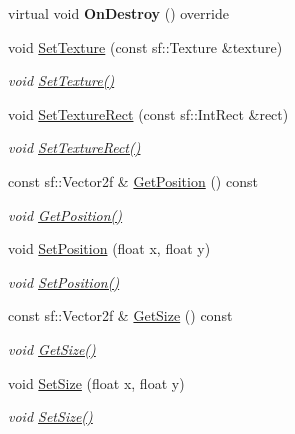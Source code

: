 \begin{DoxyCompactItemize}
virtual void {\bfseries On\+Destroy} () override
\item 
void \hyperlink{classrvl_1_1_sprite_component_aa035e9f7abf6d522ca44e115d0887a5c}{Set\+Texture} (const sf\+::\+Texture \&texture)
\begin{DoxyCompactList}\small\item\em void \hyperlink{classrvl_1_1_sprite_component_aa035e9f7abf6d522ca44e115d0887a5c}{Set\+Texture()} \end{DoxyCompactList}\item 
void \hyperlink{classrvl_1_1_sprite_component_a5d87c00cacc2ed7db9d69cdb15c02505}{Set\+Texture\+Rect} (const sf\+::\+Int\+Rect \&rect)
\begin{DoxyCompactList}\small\item\em void \hyperlink{classrvl_1_1_sprite_component_a5d87c00cacc2ed7db9d69cdb15c02505}{Set\+Texture\+Rect()} \end{DoxyCompactList}\item 
const sf\+::\+Vector2f \& \hyperlink{classrvl_1_1_sprite_component_a6408db6adf10872ff8495b2aac408bd8}{Get\+Position} () const
\begin{DoxyCompactList}\small\item\em void \hyperlink{classrvl_1_1_sprite_component_a6408db6adf10872ff8495b2aac408bd8}{Get\+Position()} \end{DoxyCompactList}\item 
void \hyperlink{classrvl_1_1_sprite_component_ab849d5ea89e7743185a2595b4888800a}{Set\+Position} (float x, float y)
\begin{DoxyCompactList}\small\item\em void \hyperlink{classrvl_1_1_sprite_component_ab849d5ea89e7743185a2595b4888800a}{Set\+Position()} \end{DoxyCompactList}\item 
const sf\+::\+Vector2f \& \hyperlink{classrvl_1_1_sprite_component_a73f707ee88ac564b5a552b6605a2ae6f}{Get\+Size} () const
\begin{DoxyCompactList}\small\item\em void \hyperlink{classrvl_1_1_sprite_component_a73f707ee88ac564b5a552b6605a2ae6f}{Get\+Size()} \end{DoxyCompactList}\item 
void \hyperlink{classrvl_1_1_sprite_component_a615e08757168a43c867145c2021949b6}{Set\+Size} (float x, float y)
\begin{DoxyCompactList}\small\item\em void \hyperlink{classrvl_1_1_sprite_component_a615e08757168a43c867145c2021949b6}{Set\+Size()} \end{DoxyCompactList}\item 

\end{DoxyCompactItemize}
